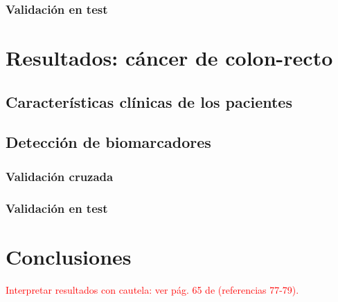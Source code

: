 \subsubsection{Validación en test}

\section{Resultados: cáncer de colon-recto}

\subsection{Características clínicas de los pacientes}

\subsection{Detección de biomarcadores}

\subsubsection{Validación cruzada}

\subsubsection{Validación en test}

\section{Conclusiones}

\textcolor{red}{Interpretar resultados con cautela: ver pág. 65 de \cite{CastilloSecilla2020} (referencias 77-79).}\\
